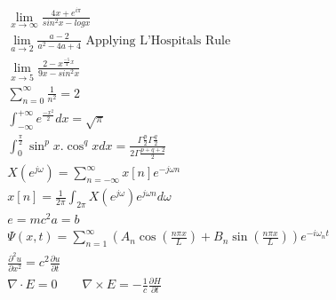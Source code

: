 \documentclass{article}
\begin{document}
	
	\begin{subequations}
		
		\begin{align}
			&\lim_{x\to\infty} \nonumber
			\frac{4x+e^{i\pi}}{sin^2x-logx}
			\\
			&\lim_{a\to2} \nonumber
			\frac{a-2}{a^2-4a+4} \text{   Applying L'Hospitals Rule}
			\\
			&\lim_{x\to5} \nonumber
			\frac{2-x^{\frac{-5}{4}x}}{9x-sin^2x}
			\\
			&\sum_{n = 0}^{\infty}\frac{1}{n^2} = 2 \nonumber
			\\
			&\int_{-\infty}^{+\infty}{e^\frac{-x^2}{2}} dx = \sqrt{\pi} \nonumber
			\\
			&\int_{0}^{\frac{\pi}{2}}{\sin^px.\cos^qx} dx = \frac{\Gamma{\frac{p}{2}}\Gamma{\frac{q}{2}}}{2\Gamma{\frac{p+q+2}{2}}}
			\\
			&X(e^{j{\omega}}) = \sum_{n = -\infty}^{\infty} x[n]e^{-j{\omega}n}
			\\
			&x[n] = \frac{1}{2\pi}\int_{2\pi}^{}X(e^{j{\omega}})e^{j{\omega}n}d{\omega}
			\\
			&e = mc^2a = b
			\\
			&\Psi(x,t) = \sum_{n=1}^{\infty} \left( A_n \cos \left( \frac{n \pi x}{L} \right) + B_n \sin \left( \frac{n \pi x}{L} \right) \right) e^{-i \omega_n t}
			\\
			&\frac{\partial^2u}{\partial x^2} = c^2 \frac{\partial u}{\partial t}
			\\
			&\nabla\cdot E = 0 \qquad \nabla\times E = -\frac{1}{c}\frac{\partial H}{\partial t}
			\\
		\end{align}
	\end{subequations}
	
\end{document}
